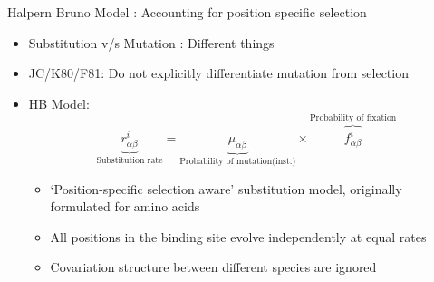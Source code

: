 \documentclass[10pt]{beamer}
\begin{document}
\begin{frame}[fragile]{Halpern Bruno Model : Accounting for position specific selection }
\begin{itemize}
\item Substitution v/s Mutation : Different things
\item JC/K80/F81: Do not explicitly differentiate mutation from selection
\item HB Model:
$$
\underbrace{r_{\alpha\beta}^{i}}_{\text{Substitution rate}}   =   \underbrace{\mu_{\alpha\beta}}_{\text{Probability of mutation(inst.)}} \times  \overbrace{f_{\alpha\beta}^i }^\text{Probability of fixation}
$$
\begin{itemize}
\item `Position-specific selection aware' substitution model, originally formulated for amino acids
\item All positions in the binding site evolve independently at equal rates
\item Covariation structure between different species are ignored
 
\end{itemize}
\end{itemize}

\end{frame}
\end{document}

